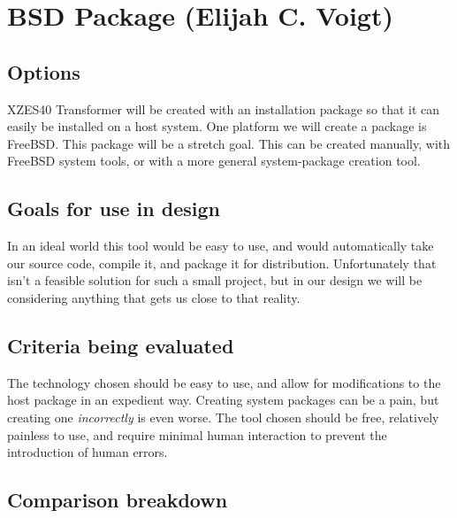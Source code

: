 \section{BSD Package (Elijah C. Voigt)}

\subsection{Options}

XZES40 Transformer will be created with an installation package so that it can easily be installed on a host system.
One platform we will create a package is FreeBSD.
This package will be a stretch goal.
This can be created manually, with FreeBSD system tools, or with a more general system-package creation tool.

\subsection{Goals for use in design}

In an ideal world this tool would be easy to use, and would automatically take our source code, compile it, and package it for distribution.
Unfortunately that isn't a feasible solution for such a small project, but in our design we will be considering anything that gets us close to that reality.

\subsection{Criteria being evaluated}

The technology chosen should be easy to use, and allow for modifications to the host package in an expedient way.
Creating system packages can be a pain, but creating one \textit{incorrectly} is even worse.
The tool chosen should be free, relatively painless to use, and require minimal human interaction to prevent the introduction of human errors.

\subsection{Comparison breakdown}

